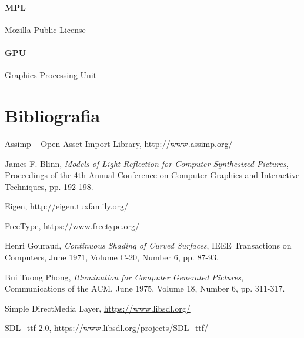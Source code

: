 \documentclass[10pt,a4paper]{article}
\begin{document}
\label{abbr:mpl}
\paragraph{MPL} Mozilla Public License

\label{abbr:gpu}
\paragraph{GPU} Graphics Processing Unit

\renewcommand*{\refname}{\vspace*{-2em}}
\section{Bibliografia}
\begin{thebibliography}{99}

	Assimp -- Open Asset Import Library,
	\url{http://www.assimp.org/}

	James F. Blinn,
	\emph{Models of Light Reflection for Computer Synthesized Pictures},
	Proceedings of the 4th Annual Conference on Computer Graphics and Interactive Techniques,
	pp. 192-198.

	Eigen,
	\url{http://eigen.tuxfamily.org/}

	FreeType,
	\url{https://www.freetype.org/}
	
	Henri Gouraud,
	\emph{Continuous Shading of Curved Surfaces},
	IEEE Transactions on Computers,
	June 1971, Volume C-20, Number 6,
	pp. 87-93.

	Bui Tuong Phong,
	\emph{Illumination for Computer Generated Pictures},
	Communications of the ACM,
	June 1975, Volume 18, Number 6,
	pp. 311-317.

	Simple DirectMedia Layer,
	\url{https://www.libsdl.org/}

	SDL\_ttf 2.0,
	\url{https://www.libsdl.org/projects/SDL_ttf/}
\end{thebibliography}
\end{document}
